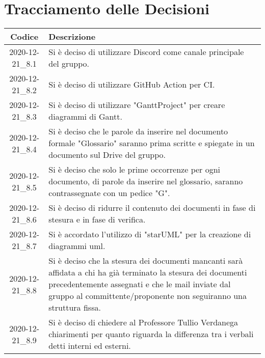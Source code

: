 \section*{Tracciamento delle Decisioni}

\begin{center}
	\begin{longtable}{|c|p{13cm}|}
	\hline
	\rowcolor{lighter-grayer}
	\textbf{Codice} & \textbf{Descrizione} \\
	\hline
	\endfirsthead

	
	2020-12-21\_8.1 & Si è deciso di utilizzare Discord come canale principale del gruppo. \\
	\hline
	2020-12-21\_8.2 & Si è deciso di utilizzare GitHub Action per CI. \\
	\hline
	2020-12-21\_8.3 & Si è deciso di utilizzare "GanttProject" per creare diagrammi di Gantt.  \\
	\hline
	2020-12-21\_8.4 & Si è deciso che le parole da inserire nel documento formale "Glossario" saranno prima scritte e spiegate in un documento sul Drive del gruppo.  \\
	\hline
	2020-12-21\_8.5 & Si è deciso che solo le prime occorrenze per ogni documento, di parole da inserire nel glossario, saranno contrassegnate con un pedice "G". \\
	\hline
	2020-12-21\_8.6 & Si è deciso di ridurre il contenuto dei documenti in fase di stesura e in fase di verifica. \\
	\hline
	2020-12-21\_8.7 & Si è accordato l'utilizzo di "starUML" per la creazione di diagrammi uml.  \\
	\hline
	2020-12-21\_8.8 & Si è deciso che la stesura dei documenti mancanti sarà affidata a chi ha già terminato la stesura dei documenti precedentemente assegnati e che le mail inviate dal gruppo al committente/proponente non seguiranno una struttura fissa.  \\
	\hline
	2020-12-21\_8.9 & Si è deciso di chiedere al Professore Tullio Verdanega chiarimenti per quanto riguarda la differenza tra i verbali detti interni ed esterni.  \\
	

	\end{longtable}
\end{center}
